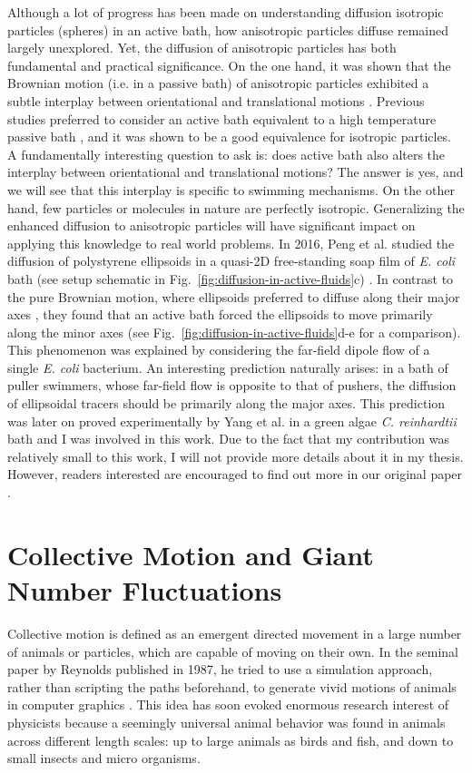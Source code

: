 Although a lot of progress has been made on understanding diffusion isotropic particles (spheres) in an active bath, how anisotropic particles diffuse remained largely unexplored. Yet, the diffusion of anisotropic particles has both fundamental and practical significance. On the one hand, it was shown that the Brownian motion (i.e. in a passive bath) of anisotropic particles exhibited a subtle interplay between orientational and translational motions \cite{Han2006}. Previous studies preferred to consider an active bath equivalent to a high temperature passive bath \cite{Wu2000}, and it was shown to be a good equivalence for isotropic particles. A fundamentally interesting question to ask is: does active bath also alters the interplay between orientational and translational motions? The answer is yes, and we will see that this interplay is specific to swimming mechanisms. On the other hand, few particles or molecules in nature are perfectly isotropic. Generalizing the enhanced diffusion to anisotropic particles will have significant impact on applying this knowledge to real world problems. In 2016, Peng et al. studied the diffusion of polystyrene ellipsoids in a quasi-2D free-standing soap film of \textit{E. coli} bath (see setup schematic in Fig.~\ref{fig:diffusion-in-active-fluids}c) \cite{Peng2016}. In contrast to the pure Brownian motion, where ellipsoids preferred to diffuse along their major axes \cite{Han2006}, they found that an active bath forced
the ellipsoids to move primarily along the minor axes (see Fig.~\ref{fig:diffusion-in-active-fluids}d-e for a comparison). This phenomenon was explained by considering the far-field dipole flow of a single \textit{E. coli} bacterium. An interesting prediction naturally arises: in a bath of puller swimmers, whose far-field flow is opposite to that of pushers, the diffusion of ellipsoidal tracers should be primarily along the major axes. This prediction was later on proved experimentally by Yang et al. \cite{Yang2016} in a green algae \textit{C. reinhardtii} bath and I was involved in this work. Due to the fact that my contribution was relatively small to this work, I will not provide more details about it in my thesis. However, readers interested are encouraged to find out more in our original paper \cite{Yang2016}.





\section{Collective Motion and Giant Number Fluctuations}
Collective motion is defined as an emergent directed movement in a large number of animals or particles, which are capable of moving on their own. In the seminal paper by Reynolds published in 1987, he tried to use a simulation approach, rather than scripting the paths beforehand, to generate vivid motions of animals in computer graphics \cite{Reynolds1987}. This idea has soon evoked enormous research interest of physicists because a seemingly universal animal behavior was found in animals across different length scales: up to large animals as birds and fish, and down to small insects and micro organisms.

